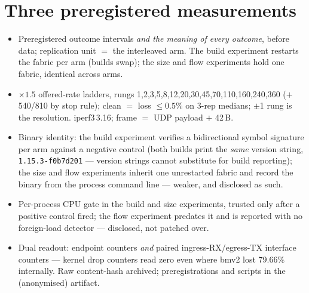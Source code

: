 \documentclass[sigconf,nonacm,anonymous]{acmart}
\begin{document}
\section{Three preregistered measurements}

\begin{itemize}\setlength\itemsep{0pt}
\item Preregistered outcome intervals \emph{and the meaning of every outcome},
  before data; replication unit $=$ the interleaved arm. The build experiment
  restarts the fabric per arm (builds swap); the size and flow experiments
  hold one fabric, identical across arms.
\item $\times1.5$ offered-rate ladders, rungs
  1,2,3,5,8,12,20,30,45,70,110,160,240,360 ($+$540/810 by stop rule); clean
  $=$ loss ${\le}0.5\%$ on 3-rep medians; $\pm$1 rung is the resolution.
  iperf3\,3.16; frame $=$ UDP payload $+$ 42\,B.
\item Binary identity: the build experiment verifies a bidirectional symbol
  signature per arm against a negative control (both builds print the
  \emph{same} version string, \texttt{1.15.3-f0b7d201} --- version strings
  cannot substitute for build reporting); the size and flow experiments
  inherit one unrestarted fabric and record the binary from the process
  command line --- weaker, and disclosed as such.
\item Per-process CPU gate in the build and size experiments, trusted only
  after a positive control fired; the flow experiment predates it and is
  reported with no foreign-load detector --- disclosed, not patched over.
\item Dual readout: endpoint counters \emph{and} paired
  ingress-RX/egress-TX interface counters --- kernel drop counters read zero
  even where bmv2 lost 79.66\% internally. Raw content-hash archived;
  preregistrations and scripts in the (anonymised) artifact.
\end{itemize}
\end{document}
